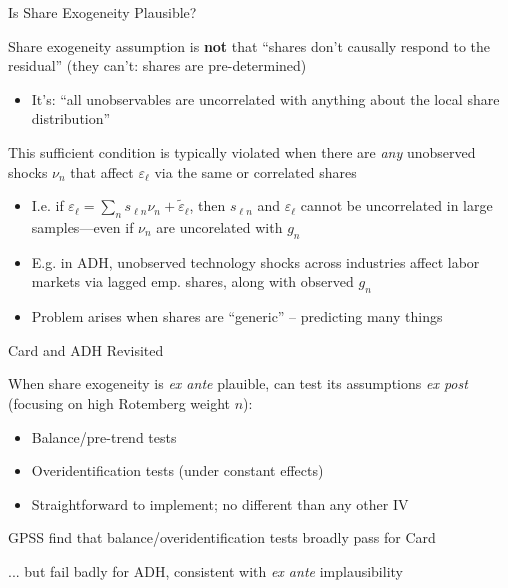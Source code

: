 \documentclass{beamer}
\begin{document}
\begin{frame}{Is Share Exogeneity Plausible?}


 Share exogeneity assumption is \textbf{not} that ``shares don't causally respond to the residual'' (they can't: shares are pre-determined)
	\begin{itemize}
	\item It's: ``all unobservables are uncorrelated with anything about the local share distribution''
	\end{itemize}\bigskip\pause{}

This sufficient condition is typically violated when there are \emph{any} unobserved shocks $\nu_n$ that affect $\varepsilon_\ell$ via the same or correlated shares
\smallskip
	\begin{itemize}
	\item %
	I.e. if $\varepsilon_\ell=\sum_n s_{\ell n}\nu_n+\tilde{\varepsilon}_\ell$, then $s_{\ell n}$ and $\varepsilon_\ell$ cannot be uncorrelated in large samples---even if $\nu_n$ are uncorelated with $g_n$\smallskip
	\item E.g. in ADH, unobserved technology shocks across industries affect labor markets via lagged emp. shares, along with observed $g_n$\smallskip
	\item Problem arises when shares are ``generic'' -- predicting many things
	\end{itemize}\bigskip
\end{frame}

\begin{frame}{Card and ADH Revisited}

When share exogeneity is \emph{ex ante} plauible, can test its assumptions \emph{ex post} (focusing on high Rotemberg weight $n$):\smallskip
\begin{itemize}
\item Balance/pre-trend tests
\item Overidentification tests (under constant effects)\smallskip
\item Straightforward to implement; no different than any other IV\smallskip
\end{itemize}
\bigskip\pause{}

GPSS find that balance/overidentification tests broadly pass for Card

 ... but fail badly for ADH, consistent with \emph{ex ante} implausibility
\end{frame}
\end{document}
